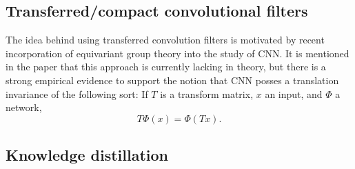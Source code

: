 \subsection{Transferred/compact convolutional filters}
The idea behind using transferred convolution filters is motivated by recent
incorporation of equivariant group theory into the study of CNN. It is mentioned
in the paper that this approach is currently lacking in theory, but there is a
strong empirical evidence to support the notion that CNN posses a translation
invariance of the following sort: If $T$ is a transform matrix, $x$ an input,
and $\Phi$ a network,
\begin{equation}\label{sum-1:eqv-gp-th}
  T\Phi(x)=\Phi(Tx).
\end{equation}

\subsection{Knowledge distillation} 



